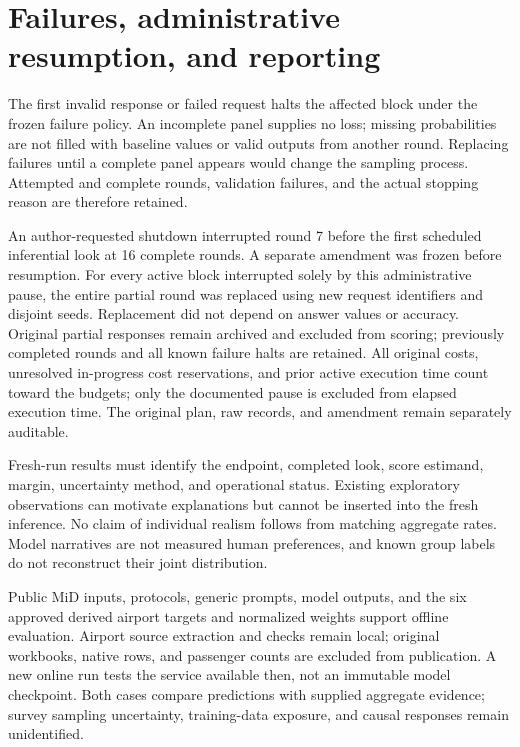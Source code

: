 \documentclass{article}
\begin{document}
\section{Failures, administrative resumption, and reporting}
The first invalid response or failed request halts the affected block under the frozen failure policy. An incomplete panel supplies no loss; missing probabilities are not filled with baseline values or valid outputs from another round. Replacing failures until a complete panel appears would change the sampling process. Attempted and complete rounds, validation failures, and the actual stopping reason are therefore retained.

An author-requested shutdown interrupted round 7 before the first scheduled inferential look at 16 complete rounds. A separate amendment was frozen before resumption. For every active block interrupted solely by this administrative pause, the entire partial round was replaced using new request identifiers and disjoint seeds. Replacement did not depend on answer values or accuracy. Original partial responses remain archived and excluded from scoring; previously completed rounds and all known failure halts are retained. All original costs, unresolved in-progress cost reservations, and prior active execution time count toward the budgets; only the documented pause is excluded from elapsed execution time. The original plan, raw records, and amendment remain separately auditable.

Fresh-run results must identify the endpoint, completed look, score estimand, margin, uncertainty method, and operational status. Existing exploratory observations can motivate explanations but cannot be inserted into the fresh inference. No claim of individual realism follows from matching aggregate rates. Model narratives are not measured human preferences, and known group labels do not reconstruct their joint distribution.



Public MiD inputs, protocols, generic prompts, model outputs, and the six approved derived airport targets and normalized weights support offline evaluation. Airport source extraction and checks remain local; original workbooks, native rows, and passenger counts are excluded from publication. A new online run tests the service available then, not an immutable model checkpoint. Both cases compare predictions with supplied aggregate evidence; survey sampling uncertainty, training-data exposure, and causal responses remain unidentified.



\end{document}
